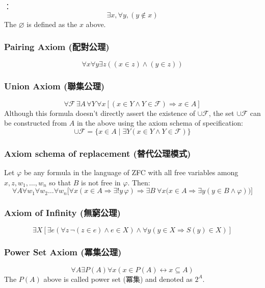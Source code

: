 \documentclass[a4paper,12pt]{report}
\begin{document}
\begin{itemizle}
：
\[\exists x , \forall y , (y \notin x) \]
The $\varnothing$ is defined as the $x$ above.
\subsubsection{Pairing Axiom (配對公理)}
\[ \forall x\forall y\exists z((x\in z)\land (y\in z))\]
\subsubsection{Union Axiom (聯集公理)}
\[ \forall {\mathcal {F}}\,\exists A\,\forall Y\,\forall x[(x\in Y\land Y\in {\mathcal {F}})\Rightarrow x\in A]\]
Although this formula doesn't directly assert the existence of $\cup \mathcal {F}$, the set $\cup \mathcal {F}$ can be constructed from $A$ in the above using the axiom schema of specification:
\[\cup \mathcal {F}=\{x\in A\mid\exists Y(x\in Y\land Y\in {\mathcal {F}})\}\]
\subsubsection{Axiom schema of replacement (替代公理模式)}
Let $\varphi$ be any formula in the language of ZFC with all free variables among $x,z,w_{1},\ldots ,w_{n}$ so that $B$ is not free in 
$\varphi$. Then:
\[ \forall A\forall w_{1}\forall w_{2}\ldots \forall w_{n}{\bigl [}\forall x(x\in A\Rightarrow \exists !y\,\varphi )\Rightarrow \exists B\ \forall x{\bigl (}x\in A\Rightarrow \exists y(y\in B\land \varphi ){\bigr )}{\bigr ]}\]
\subsubsection{Axiom of Infinity (無窮公理)}
\[ \exists X\left[\exists e(\forall z\,\neg (z\in e)\land e\in X)\land \forall y(y\in X\Rightarrow S(y)\in X)\right]\]
\subsubsection{Power Set Axiom (冪集公理)}
\[\forall A \exists P(A) \forall x (x \in P(A) \leftrightarrow x \subseteq A)\]
The $P(A)$ above is called power set (冪集) and denoted as $2^A$.

\end{itemizle}
\end{document}
